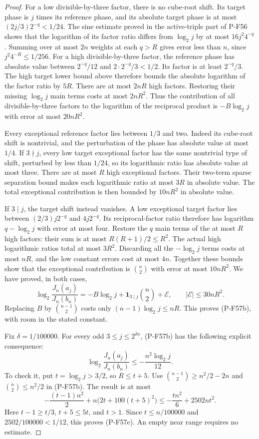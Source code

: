 \begin{proof}
For a low divisible-by-three factor, there is no cube-root
shift. Its target phase is $j$ times its reference phase,
and its absolute target phase is at most
$(2j/3)2^{-q}<1/24$.
The sine estimate proved in the active-triple part of P-F56
shows that the logarithm of its factor ratio differs from
$\log_2j$ by at most $16j^2 4^{-q}$.
Summing over at most $2n$ weights at each $q>R$ gives
error less than $n$, since
$j^2 4^{-R}\le1/256$.
For a high divisible-by-three factor, the reference phase
has absolute value between $2^{-q}/12$ and
$2\cdot2^{-q}/3<1/2$.
Its factor is at least $2^{-q}/3$.
The high target lower bound above therefore bounds the
absolute logarithm of the factor ratio by $5R$.
There are at most $2nR$ high factors.
Restoring their missing $\log_2j$ main terms costs
at most $2nR^2$.
Thus the contribution of all divisible-by-three factors
to the logarithm of the reciprocal product is
$-B\log_2j$ with error at most $20nR^2$.

Every exceptional reference factor lies between $1/3$ and
two. Indeed its cube-root shift is nontrivial, and the
perturbation of the phase has absolute value at most $1/4$.
If $3\nmid j$, every low target exceptional factor has
the same nontrivial type of shift, perturbed by less than
$1/24$, so its logarithmic ratio has absolute value
at most three.
There are at most $R$ high exceptional factors.
Their two-term sparse separation bound makes each
logarithmic ratio at most $3R$ in absolute value.
The total exceptional contribution is then bounded by
$10nR^2$ in absolute value.

If $3\mid j$, the target shift instead vanishes.
A low exceptional target factor lies between
$(2/3)j2^{-q}$ and $4j2^{-q}$.
Its reciprocal-factor ratio therefore has logarithm
$q-\log_2j$ with error at most four.
Restore the $q$ main terms of the at most $R$ high
factors: their sum is at most $R(R+1)/2\le R^2$.
The actual high logarithmic ratios total at most $3R^2$.
Discarding all the $-\log_2j$ terms costs at most $nR$,
and the low constant errors cost at most $4n$.
Together these bounds show that the exceptional contribution
is $\binom n2$ with error at most $10nR^2$.
We have proved, in both cases,
\[
 \log_2\frac{J_n(a_j)}{J_n(b_n)}
 =-B\log_2j+\mathbf1_{3\mid j}\binom n2+\mathcal E,
 \qquad |\mathcal E|\le30nR^2.
 \tag{P-F57d}
\]
Replacing $B$ by $\binom{n-1}2$ costs only
$(n-1)\log_2j\le nR$.
This proves (P-F57b), with room in the stated constant.

Fix
$\delta=1/100000$.
For every odd $3\le j\le2^{\delta n}$, (P-F57b)
has the following explicit consequence:
\[
 \log_2\frac{J_n(a_j)}{J_n(b_n)}
                         \le-\frac{n^2\log_2j}{12}.
 \tag{P-F57e}
\]
To check it, put $t=\log_2j>3/2$, so $R\le t+5$.
Use
$\binom{n-1}2\ge n^2/2-2n$ and
$\binom n2\le n^2/2$ in (P-F57b).
The result is at most
\[
 -\frac{(t-1)n^2}{2}
                +n\bigl(2t+100(t+5)^2\bigr)
 \le-\frac{tn^2}{6}+2502nt^2.
 \]
Here $t-1\ge t/3$, $t+5\le5t$, and $t>1$.
Since $t\le n/100000$ and
$2502/100000<1/12$, this proves (P-F57e).
An empty near range requires no estimate.


\end{proof}
